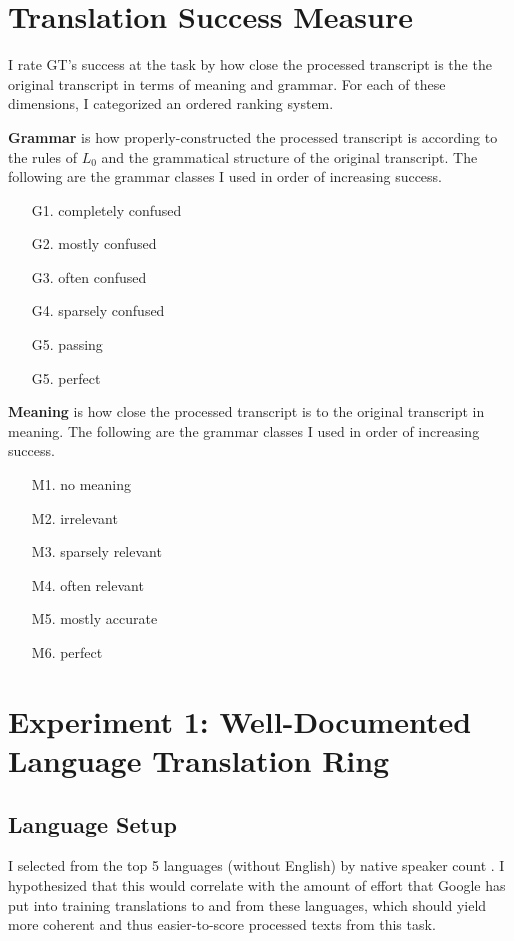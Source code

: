 \documentclass{article}
\begin{document}
\section{Translation Success Measure}


I rate GT's success at the task by how close the processed transcript is the the original transcript in terms of meaning and grammar. For each of these dimensions, I categorized an ordered ranking system.




\textbf{Grammar} is how properly-constructed the processed transcript is according to the rules of $L_0$ and the grammatical structure of the original transcript.
The following are the grammar classes I used in order of increasing success.
\begin{enumerate}
  \item[G1.] completely confused
  \item[G2.] mostly confused
  \item[G3.] often confused
  \item[G4.] sparsely confused
  \item[G5.] passing
  \item[G5.] perfect
\end{enumerate}




\textbf{Meaning} is how close the processed transcript is to the original transcript in meaning.
The following are the grammar classes I used in order of increasing success.
\begin{enumerate}
  \item[M1.] no meaning
  \item[M2.] irrelevant
  \item[M3.] sparsely relevant
  \item[M4.] often relevant
  \item[M5.] mostly accurate
  \item[M6.] perfect
\end{enumerate}


\section{Experiment 1: Well-Documented Language Translation Ring}\subsection{Language Setup}


I selected from the top 5 languages (without English) by native speaker count . I hypothesized that this would correlate with the amount of effort that Google has put into training translations to and from these languages, which should yield more coherent and thus easier-to-score processed texts from this task.
\end{document}
